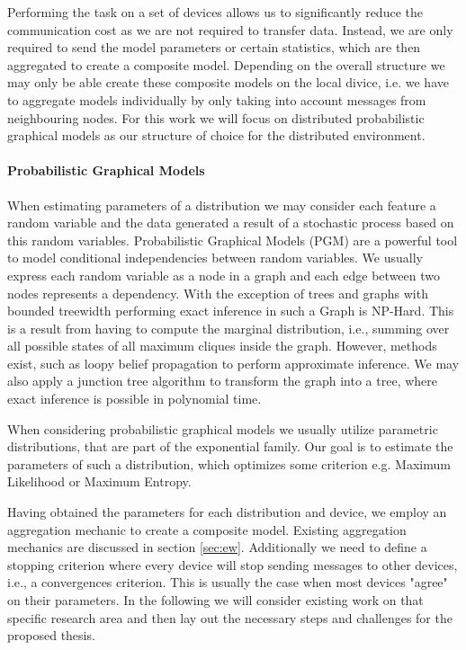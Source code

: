   Performing the task on a set of devices allows us to significantly reduce the communication cost as we are not required to transfer data.
  Instead, we are only required to send the model parameters or certain statistics, which are then aggregated to create a composite model.
  Depending on the overall structure we may only be able create these composite models on the local divice, i.e. we have to aggregate models individually by only taking into account messages from neighbouring nodes.
  For this work we will focus on distributed probabilistic graphical models as our structure of choice for the distributed environment.
  \paragraph{Probabilistic Graphical Models}  


  When estimating parameters of a distribution we may consider each feature a random variable and the data generated a result of a stochastic process based on this random variables.
  Probabilistic Graphical Models (PGM) are a powerful tool to model conditional independencies between random variables. 
  We usually express each random variable as a node in a graph and each edge between two nodes represents a dependency. 
  With the exception of trees and graphs with bounded treewidth performing exact inference in such a Graph is NP-Hard.
  This is a result from having to compute the marginal distribution, i.e., summing over all possible states of all maximum cliques inside the graph.
  However, methods exist, such as loopy belief propagation to perform approximate inference.
  We may also apply a junction tree algorithm to transform the graph into a tree, where exact inference is possible in polynomial time.
    
  When considering probabilistic graphical models we usually utilize parametric distributions, that are part of the exponential family. 
  Our goal is to estimate the parameters of such a distribution, which optimizes some criterion e.g. Maximum Likelihood or Maximum Entropy.
  

  Having obtained the parameters for each distribution and device, we employ an aggregation mechanic to create a composite model.
  Existing aggregation mechanics are discussed in section \ref{sec:ew}.
  Additionally we need to define a stopping criterion where every device will stop sending messages to other devices, i.e., a convergences criterion.
  This is usually the case when most devices "agree" on their parameters.
  In the following we will consider existing work on that specific research area and then lay out the necessary steps and challenges for the proposed thesis.

